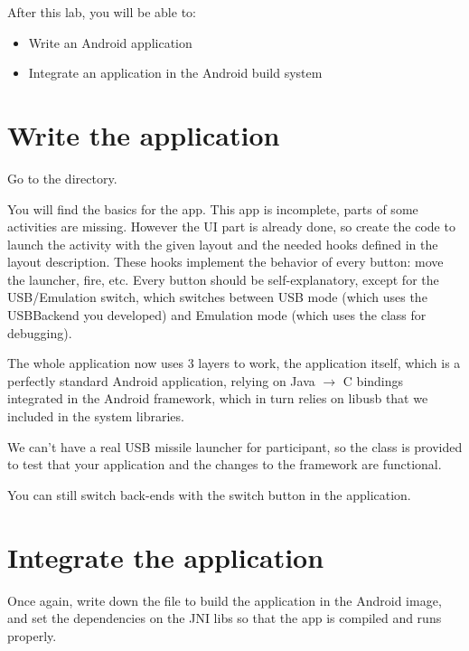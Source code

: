 
After this lab, you will be able to:
\begin{itemize}
  \item Write an Android application
  \item Integrate an application in the Android build system
\end{itemize}

\section{Write the application}

Go to the  directory.

You will find the basics for the  app. This app is incomplete,
parts of some activities are missing. However the UI part is
already done, so create the code to launch the activity with the given
layout and the needed hooks defined in the layout description. These
hooks implement the behavior of every button: move the
launcher, fire, etc.  Every button should be self-explanatory, except
for the USB/Emulation switch, which switches between USB mode (which
uses the USBBackend you developed) and Emulation mode (which uses the
 class for debugging).

The whole application now uses 3 layers to work, the application itself, which
is a perfectly standard Android application, relying on Java $\rightarrow$ C
bindings integrated in the Android framework, which in turn relies on libusb
that we included in the system libraries.

We can't have a real USB missile launcher for participant,
so the  class is provided to test that your application and the
changes to the framework are functional.

You can still switch back-ends with the switch button in the application.

\section{Integrate the application}

Once again, write down the  file to build the application in the
Android image, and set the dependencies on the JNI libs so that the app
is compiled and runs properly.

